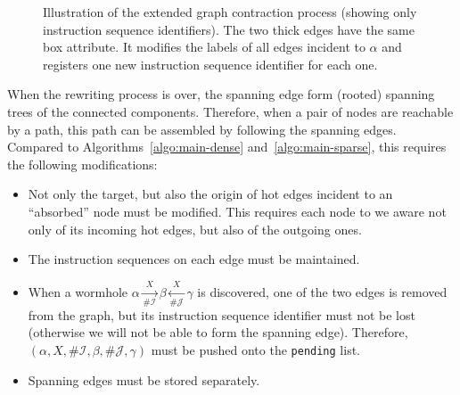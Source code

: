 \documentclass[a4paper,UKenglish,cleveref, autoref]{lipics-v2021}
\begin{document}
\begin{figure}[tb]
\caption{\label{fig:merge-extended} Illustration of the extended graph contraction
  process (showing only instruction sequence identifiers). The two thick edges
  have the same box attribute. It modifies the labels of all edges incident to
  $\alpha$ and registers one new instruction sequence identifier for each one.}
\end{figure}

When the rewriting process is over, the spanning edge form (rooted) spanning trees
of the connected components. Therefore, when a pair of nodes are reachable by a
path, this path can be assembled by following the spanning edges. Compared to
Algorithms~\ref{algo:main-dense} and~\ref{algo:main-sparse}, this requires the
following modifications:
\begin{itemize}
\item Not only the target, but also the origin of hot edges incident to an
  ``absorbed'' node must be modified. This requires each node to we aware not
  only of its incoming hot edges, but also of the outgoing ones.

\item The instruction sequences on each edge must be maintained.

\item When a wormhole
  $\alpha \xrightarrow[\# \mathcal{I}]{X} \beta \xleftarrow[\# \mathcal{J}]{X}
  \gamma$ is discovered, one of the two edges is removed from the graph, but its
  instruction sequence identifier must not be lost (otherwise we will not be
  able to form the spanning edge). Therefore,
  $(\alpha, X, \# \mathcal{I}, \beta, \# \mathcal{J}, \gamma)$ must be pushed
  onto the \texttt{pending} list.

\item Spanning edges must be stored separately.
\end{itemize}
\end{document}
